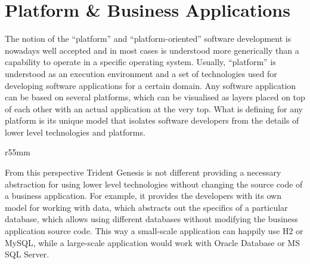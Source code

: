 \section{Platform \& Business Applications}\label{sec:02}  

  The notion of the ``platform'' and ``platform-oriented'' software development is nowadays well accepted and in most cases is understood more generically than a capability to operate in a specific operating system.
  Usually, ``platform'' is understood as an execution environment and a set of technologies used for developing software applications for a certain domain.
  Any software application can be based on several platforms, which can be visualised as layers placed on top of each other with an actual application at the very top.
  What is defining for any platform is its unique model that isolates software developers from the details of lower level technologies and platforms.

  \begin{wrapfigure}{r}{55mm}
    \centering    
  \end{wrapfigure}
  
  From this perspective Trident Genesis is not different providing a necessary abstraction for using lower level technologies without changing the source code of a business application.
  For example, it provides the developers with its own model for working with data, which abstracts out the specifics of a particular database, which allows using different databases without modifying the business application source code.
  This way a small-scale application can happily use H2 or MySQL, while a large-scale application would work with Oracle Database or MS SQL Server.

